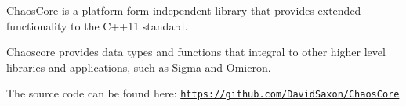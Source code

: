 Chaos\+Core is a platform form independent library that provides extended functionality to the C++11 standard.

Chaoscore provides data types and functions that integral to other higher level libraries and applications, such as Sigma and Omicron.

The source code can be found here\+: \href{https://github.com/DavidSaxon/ChaosCore}{\tt https\+://github.\+com/\+David\+Saxon/\+Chaos\+Core} 